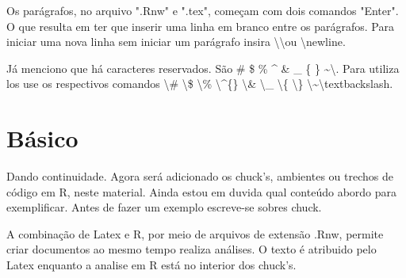 \documentclass[12pt,twoside]{article}
\begin{document}
Os parágrafos, no arquivo ".Rnw" e ".tex", começam com dois comandos "Enter". O que resulta em ter que inserir uma linha em branco entre os parágrafos. Para iniciar uma nova linha sem iniciar um parágrafo insira \textbackslash \textbackslash  ou \textbackslash newline.

Já menciono que há caracteres reservados. São \# \$ \% \^{} \& \_ \{ \} \textasciitilde \textbackslash. Para utiliza los use os respectivos comandos \textbackslash\# \textbackslash\$ \textbackslash\% \textbackslash \^{}\{\} \textbackslash\& \textbackslash\_ \textbackslash\{ \textbackslash\} \textbackslash\textasciitilde \textbackslash textbackslash.

\section{Básico}

Dando continuidade. Agora será adicionado os chuck's, ambientes ou trechos de código em R, neste material. Ainda estou em duvida qual conteúdo abordo para exemplificar. Antes de fazer um exemplo escreve-se sobres chuck.

A combinação de Latex e R, por meio de arquivos de extensão .Rnw, permite criar documentos ao mesmo tempo realiza análises. O texto é atribuido pelo Latex enquanto a analise em R está no interior dos chuck's. 
\end{document}
